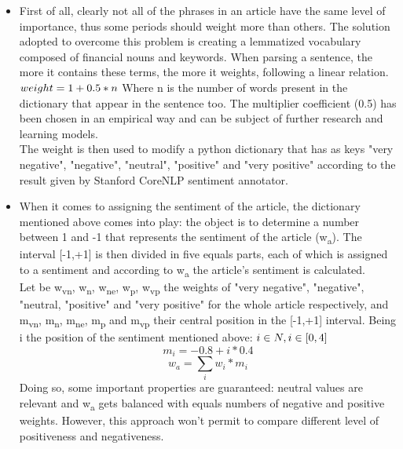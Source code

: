 \begin{itemize}
\item
First of all, clearly not all of the phrases in an article have the same level of importance, thus some periods should weight more than others. The solution adopted to overcome this problem is creating a lemmatized vocabulary composed of financial nouns and keywords. When parsing a sentence, the more it contains these terms, the more it weights, following a linear relation. \\
\begin{math}
weight = 1 + 0.5*n \\
\end{math}
Where n is the number of words present in the dictionary that appear in the sentence too.
The multiplier coefficient (0.5) has been chosen in an empirical way and can be subject of further research and learning models. \\
The weight is then used to modify a python dictionary that has as keys "very negative", "negative", "neutral", "positive" and "very positive" according to the result given by Stanford CoreNLP sentiment annotator.
\item 
When it comes to assigning the sentiment of the article, the dictionary mentioned above comes into play: the object is to determine a number between 1 and -1 that represents the sentiment of the article (w\textsubscript{a}). The interval [-1,+1] is then divided in five equals parts, each of which is assigned to a sentiment and according to w\textsubscript{a} the article's sentiment is calculated.\\
Let be w\textsubscript{vn}, w\textsubscript{n}, w\textsubscript{ne}, w\textsubscript{p}, w\textsubscript{vp} the weights of "very negative", "negative", "neutral, "positive" and "very positive" for the whole article respectively, and m\textsubscript{vn}, m\textsubscript{n}, m\textsubscript{ne}, m\textsubscript{p} and m\textsubscript{vp} their central position in the [-1,+1] interval. Being i the position of the sentiment mentioned above:\newline \newline
\begin{math}
i \in N, i \in [0,4] \\
\end{math}
\begin{equation}
m_i= -0.8+i*0.4
\end{equation}
\begin{equation}
w_a = \sum\limits_{i} w_i * m_i
\end{equation}
Doing so, some important properties are guaranteed: neutral values are relevant and w\textsubscript{a} gets balanced with equals numbers of negative and positive weights. However, this approach won't permit to compare different level of positiveness and negativeness. 
\end{itemize}
